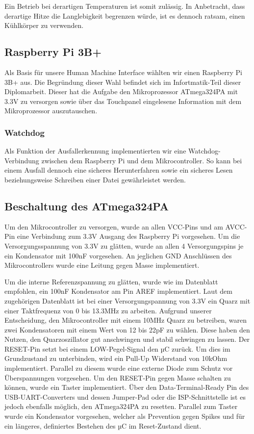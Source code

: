 Ein Betrieb bei derartigen Temperaturen ist somit zulässig.
In Anbetracht, dass derartige Hitze die Langlebigkeit begrenzen würde, ist es dennoch ratsam, einen Kühlkörper zu verwenden.

\subsection{Raspberry Pi 3B+}

Als Basis für unsere Human Machine Interface wählten wir einen Raspberry Pi 3B+ aus.
Die Begründung dieser Wahl befindet sich im Infortmatik-Teil dieser Diplomarbeit.
Dieser hat die Aufgabe den Mikroprozessor ATmega324PA mit 3.3V zu versorgen sowie über das Touchpanel eingelesene Information mit dem Mikroprozessor auszutauschen.

\subsubsection{Watchdog}

Als Funktion der Ausfallerkennung implementierten wir eine Watchdog-Verbindung zwischen dem Raspberry Pi und dem Mikrocontroller.
So kann bei einem Ausfall dennoch eine sicheres Herunterfahren sowie ein sicheres Lesen beziehungsweise Schreiben einer Datei gewährleistet werden.

\subsection{Beschaltung des ATmega324PA}

Um den Mikrocontroller zu versorgen, wurde an allen VCC-Pins und am AVCC-Pin eine Verbindung zum 3.3V Ausgang des Raspberry Pi vorgesehen.
Um die Versorgungsspannung von 3.3V zu glätten, wurde an allen 4 Versorgungspins je ein Kondensator mit 100nF vorgesehen.
An jeglichen GND Anschlüssen des Mikrocontrollers wurde eine Leitung gegen Masse implementiert.

Um die interne Referenzspannung zu glätten, wurde wie im Datenblatt empfohlen, ein 100nF Kondensator am Pin AREF implementiert.
Laut dem zugehörigen Datenblatt ist bei einer Versorgungspannung von 3.3V ein Quarz mit einer Taktfrequenz von 0 bis 13.3MHz zu arbeiten.
Aufgrund unserer Entscheidung, den Mikrocontroller mit einem 10MHz Quarz zu betreiben, waren zwei Kondensatoren mit einem Wert von 12 bis 22pF zu wählen.
Diese haben den Nutzen, den Quarzoszillator gut anschwingen und stabil schwingen zu lassen.
Der RESET-Pin setzt bei einem LOW-Pegel-Signal den µC zurück.
Um dies im Grundzustand zu unterbinden, wird ein Pull-Up Widerstand von 10kOhm implementiert.
Parallel zu diesem wurde eine externe Diode zum Schutz vor Überspannungen vorgesehen.
Um den RESET-Pin gegen Masse schalten zu können, wurde ein Taster implementiert.
Über den Data-Terminal-Ready Pin des USB-UART-Converters und dessen Jumper-Pad oder die ISP-Schnittstelle ist es jedoch ebenfalls möglich, den ATmega324PA zu resetten.
Parallel zum Taster wurde ein Kondensator vorgesehen, welcher als Prevention gegen Spikes und für ein längeres, definiertes Bestehen des µC im Reset-Zustand dient.

